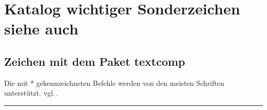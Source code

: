\section{Katalog wichtiger Sonderzeichen 
\texorpdfstring{siehe auch \cite{l2kurz}}{}
}


\subsection{Zeichen mit dem Paket textcomp} \label{cha:textcomp}
{\footnotesize Die mit * gekennzeichneten Befehle werden von den meisten Schriften unterstützt. vgl.\,\cite{l2kurz}.}

 		\hrule\vspace{0.5\baselineskip}

